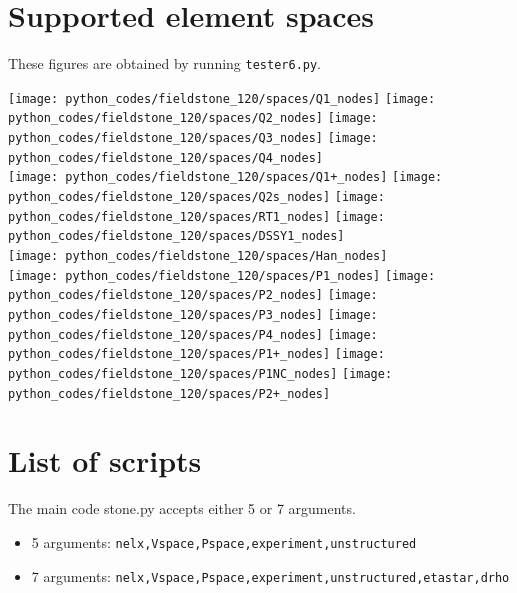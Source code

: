 \newpage
\section*{Supported element spaces}

These figures are obtained by running \lstinline{tester6.py}.

\begin{center}
\texttt{[image: python\_codes/fieldstone\_120/spaces/Q1\_nodes]}
\texttt{[image: python\_codes/fieldstone\_120/spaces/Q2\_nodes]}
\texttt{[image: python\_codes/fieldstone\_120/spaces/Q3\_nodes]}
\texttt{[image: python\_codes/fieldstone\_120/spaces/Q4\_nodes]}\\
\texttt{[image: python\_codes/fieldstone\_120/spaces/Q1+\_nodes]}
\texttt{[image: python\_codes/fieldstone\_120/spaces/Q2s\_nodes]}
\texttt{[image: python\_codes/fieldstone\_120/spaces/RT1\_nodes]}
\texttt{[image: python\_codes/fieldstone\_120/spaces/DSSY1\_nodes]}\\
\texttt{[image: python\_codes/fieldstone\_120/spaces/Han\_nodes]}\\
\texttt{[image: python\_codes/fieldstone\_120/spaces/P1\_nodes]}
\texttt{[image: python\_codes/fieldstone\_120/spaces/P2\_nodes]}
\texttt{[image: python\_codes/fieldstone\_120/spaces/P3\_nodes]}
\texttt{[image: python\_codes/fieldstone\_120/spaces/P4\_nodes]}
\texttt{[image: python\_codes/fieldstone\_120/spaces/P1+\_nodes]}
\texttt{[image: python\_codes/fieldstone\_120/spaces/P1NC\_nodes]}
\texttt{[image: python\_codes/fieldstone\_120/spaces/P2+\_nodes]}
\end{center}

\newpage
\section*{List of scripts}

The main code {\pythonfile stone.py} accepts either 5 or 7 arguments.

\begin{itemize}
\item 5 arguments: \lstinline{nelx,Vspace,Pspace,experiment,unstructured}
\item 7 arguments: \lstinline{nelx,Vspace,Pspace,experiment,unstructured,etastar,drho}
\end{itemize} 

